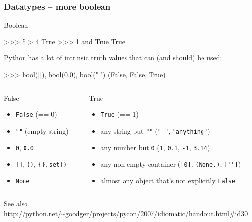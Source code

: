 \documentclass[xetex,10pt]{beamer}
\def\pythoni{\lstinline[language=pythontim]}
\def\spacer{\vspace*{1em}}
\begin{document}
\begin{frame}[fragile]
	\frametitle{Datatypes -- more boolean}
	
Boolean
\begin{python}
>>> 5 > 4
True
>>> 1 and True
True
\end{python}

Python has a lot of intrinsic truth values that can (and should) be used:	

\begin{python}
>>> bool([]), bool(0.0), bool(" ")
(False, False, True)
\end{python}
\spacer
\pause
	\begin{columns}[T]
		\begin{column}{0.3 \textwidth}
			False
			
			\begin{itemize}
			\item \pythoni{False} (== 0)
			\item \pythoni{""} (empty string)
			\item \pythoni{0}, \pythoni{0.0}
			\item \pythoni{[]}, \pythoni{()}, \verb!{}!, \pythoni{set()}
			\item \pythoni{None}
			\end{itemize}
			
		\end{column}
		\begin{column}{0.65 \textwidth}
			True
			
			\begin{itemize}
			\item \pythoni{True} (== 1)
			\item any string but \pythoni{""} (\pythoni{" "}, \pythoni{"anything"})
			\item any number but \pythoni{0} (\pythoni{1}, \pythoni{0.1}, \pythoni{-1}, \pythoni{3.14})
			\item any non-empty container (\pythoni{[0]}, \pythoni{(None,)}, \pythoni{['']})
			\item almost any object that's not explicitly \pythoni{False}
			\end{itemize}
		\end{column}
	\end{columns}
	\spacer
	See also \url{http://python.net/~goodger/projects/pycon/2007/idiomatic/handout.html#id30}
\end{frame}
\end{document}
